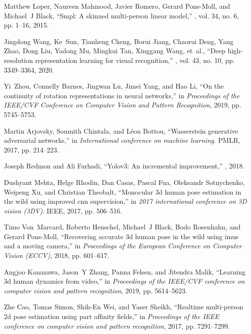 \documentclass{svproc}
\begin{document}
\begin{thebibliography}{10}
Matthew Loper, Naureen Mahmood, Javier Romero, Gerard Pons-Moll, and Michael~J
  Black,
\newblock ``Smpl: A skinned multi-person linear model,''
, vol. 34, no. 6, pp. 1--16,
  2015.

Jingdong Wang, Ke~Sun, Tianheng Cheng, Borui Jiang, Chaorui Deng, Yang Zhao,
  Dong Liu, Yadong Mu, Mingkui Tan, Xinggang Wang, et~al.,
\newblock ``Deep high-resolution representation learning for visual
  recognition,''
,
  vol. 43, no. 10, pp. 3349--3364, 2020.

Yi~Zhou, Connelly Barnes, Jingwan Lu, Jimei Yang, and Hao Li,
\newblock ``On the continuity of rotation representations in neural networks,''
\newblock in {\em Proceedings of the IEEE/CVF Conference on Computer Vision and
  Pattern Recognition}, 2019, pp. 5745--5753.

Martin Arjovsky, Soumith Chintala, and L{\'e}on Bottou,
\newblock ``Wasserstein generative adversarial networks,''
\newblock in {\em International conference on machine learning}. PMLR, 2017,
  pp. 214--223.

Joseph Redmon and Ali Farhadi,
\newblock ``Yolov3: An incremental improvement,''
, 2018.

Dushyant Mehta, Helge Rhodin, Dan Casas, Pascal Fua, Oleksandr Sotnychenko,
  Weipeng Xu, and Christian Theobalt,
\newblock ``Monocular 3d human pose estimation in the wild using improved cnn
  supervision,''
\newblock in {\em 2017 international conference on 3D vision (3DV)}. IEEE,
  2017, pp. 506--516.

Timo Von~Marcard, Roberto Henschel, Michael~J Black, Bodo Rosenhahn, and Gerard
  Pons-Moll,
\newblock ``Recovering accurate 3d human pose in the wild using imus and a
  moving camera,''
\newblock in {\em Proceedings of the European Conference on Computer Vision
  (ECCV)}, 2018, pp. 601--617.

Angjoo Kanazawa, Jason~Y Zhang, Panna Felsen, and Jitendra Malik,
\newblock ``Learning 3d human dynamics from video,''
\newblock in {\em Proceedings of the IEEE/CVF conference on computer vision and
  pattern recognition}, 2019, pp. 5614--5623.

Zhe Cao, Tomas Simon, Shih-En Wei, and Yaser Sheikh,
\newblock ``Realtime multi-person 2d pose estimation using part affinity
  fields,''
\newblock in {\em Proceedings of the IEEE conference on computer vision and
  pattern recognition}, 2017, pp. 7291--7299.


\end{thebibliography}
\end{document}

